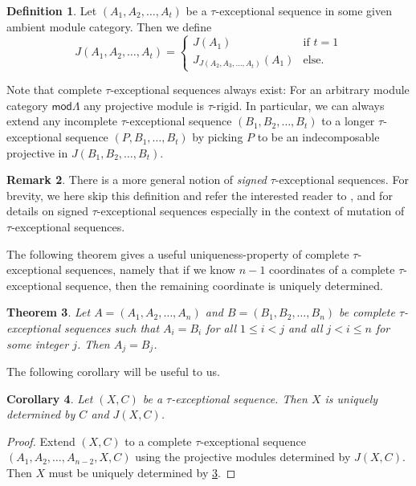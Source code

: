 \documentclass[11pt]{amsart}
\newcommand{\mods}{\mathsf{mod}}
\newtheorem{theorem}{Theorem}[section]
\newtheorem{corollary}[theorem]{Corollary}
\theoremstyle{definition}
\newtheorem{definition}[theorem]{Definition}
\newtheorem{remark}[theorem]{Remark}
\begin{document}
\begin{definition}
    Let $(A_1,A_2,\dots,A_t)$ be a $\tau$-exceptional sequence in some given ambient module category. Then we define \[J(A_1,A_2,\dots,A_t) = \begin{cases}
        J(A_1) & \text{if $t = 1$} \\
        J_{J(A_2,A_3,\dots,A_t)}(A_1) & \text{else.}  \end{cases}\]
\end{definition}

Note that complete $\tau$-exceptional sequences always exist: For an arbitrary module category $\mods \Lambda$ any projective module is $\tau$-rigid. In particular, we can always extend any incomplete $\tau$-exceptional sequence $(B_1,B_2,\dots,B_t)$ to a longer $\tau$-exceptional sequence $(P,B_1,\dots,B_t)$ by picking $P$ to be an indecomposable projective in $J(B_1,B_2,\dots,B_t)$.


\begin{remark}
    There is a more general notion of \textit{signed} $\tau$-exceptional sequences. For brevity, we here skip this definition and refer the interested reader to \cite{tauexceptional_buanmarsh}, \cite{BHM2024} and \cite{bkt} for details on signed $\tau$-exceptional sequences especially in the context of mutation of $\tau$-exceptional sequences.
\end{remark}


The following theorem gives a useful uniqueness-property of complete $\tau$-exceptional sequences, namely that if we know $n-1$ coordinates of a complete $\tau$-exceptional sequence, then the remaining coordinate is uniquely determined.

\begin{theorem}\cite[Thm. 8]{hanson_thomas_unique}\label{thm:tau_exceptional_missing_one}
Let $A = (A_1,A_2,\dots,A_n)$ and $B = (B_1,B_2,\dots,B_n)$ be complete $\tau$-exceptional sequences such that $A_i = B_i$ for all $1 \leq i < j$ and all $j < i \leq n$ for some integer $j$. Then $A_j = B_j$.
\end{theorem}

The following corollary will be useful to us. 

\begin{corollary}\label{cor:tau_uniqueness_jasso_preserve}
   Let $(X,C)$ be a $\tau$-exceptional sequence. Then $X$ is uniquely determined by $C$ and $J(X,C)$.
\end{corollary}

\begin{proof}
    Extend $(X,C)$ to a complete $\tau$-exceptional sequence $(A_1,A_2,\dots,A_{n-2},X,C)$ using the projective modules determined by $J(X,C)$. Then $X$ must be uniquely determined by \cref{thm:tau_exceptional_missing_one}.
\end{proof}
\end{document}
